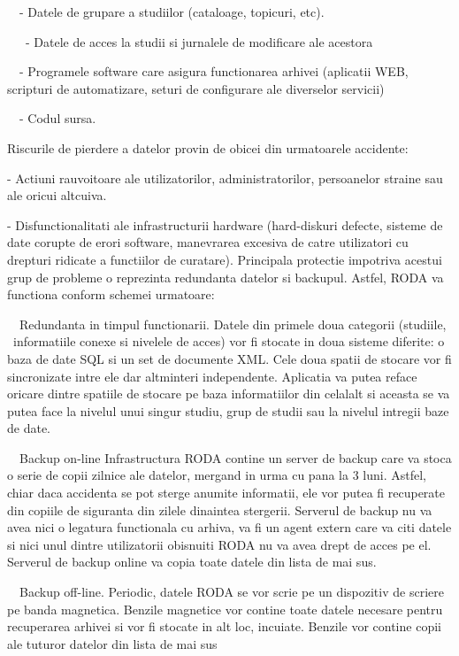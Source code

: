 {\sffamily\color{black}
\ \ {}- Datele de grupare a studiilor (cataloage, topicuri, etc).}

{\sffamily\color{black}
\ \ \ {}- Datele de acces la studii si jurnalele de modificare ale acestora}

{\sffamily\color{black}
\ \ {}- Programele software care asigura functionarea arhivei (aplicatii WEB, scripturi de automatizare, seturi de
configurare ale diverselor servicii)}

{\sffamily\color{black}
\ \ {}- Codul sursa.}

Riscurile de pierdere a datelor provin de obicei din urmatoarele accidente:

{\sffamily\color{black}
{}- Actiuni rauvoitoare ale utilizatorilor, administratorilor, persoanelor straine sau ale oricui altcuiva. }

{\sffamily\color{black}
{}- Disfunctionalitati ale infrastructurii hardware (hard-diskuri defecte, sisteme de date corupte de erori software,
manevrarea excesiva de catre utilizatori cu drepturi ridicate a functiilor de curatare). 
Principala protectie impotriva
acestui grup de probleme o reprezinta redundanta datelor si backupul. 
Astfel, RODA va functiona conform schemei urmatoare:}

{\sffamily\color{black}
\ \ Redundanta in timpul functionarii. Datele din primele doua categorii (studiile, \ informatiile conexe si nivelele de
acces) vor fi stocate in doua sisteme diferite: o baza de date SQL si un set de documente XML. Cele doua spatii de
stocare vor fi sincronizate intre ele dar altminteri independente. Aplicatia va putea reface oricare dintre spatiile de
stocare pe baza informatiilor din celalalt si aceasta se va putea face la nivelul unui singur studiu, grup de studii
sau la nivelul intregii baze de date.}

{\sffamily\color{black}
\ \ Backup on-line Infrastructura RODA contine un server de backup care va stoca o serie de copii zilnice ale datelor,
mergand in urma cu pana la 3 luni. Astfel, chiar daca accidenta se pot sterge anumite informatii, ele vor putea fi
recuperate din copiile de siguranta din zilele dinaintea stergerii. Serverul de backup nu va avea nici o legatura
functionala cu arhiva, va fi un agent extern care va citi datele si nici unul dintre utilizatorii obisnuiti RODA nu va
avea drept de acces pe el. Serverul de backup online va copia toate datele din lista de mai sus.}

{\sffamily\color{black}
\ \ Backup off-line. Periodic, datele RODA se vor scrie pe un dispozitiv de scriere pe banda magnetica. Benzile
magnetice vor contine toate datele necesare pentru recuperarea arhivei si vor fi stocate in alt loc, incuiate. Benzile
vor contine copii ale tuturor datelor din lista de mai sus }

